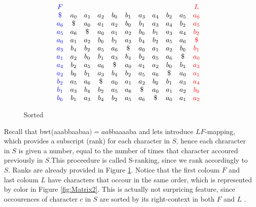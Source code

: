 \documentclass[12pt]{article} %
\begin{document}
\begin{figure}[H]
\[
\begin{array}{*{11}c}
{\color{blue} F } &  &  & & & & & & & & {\color{red} L }  \\ 
{\color{blue} \$ } & a_0 & a_1 & a_2 & b_0 & b_1 & a_3 & a_4 & b_2 & a_5 & {\color{red} a_6 } \\
{\color{blue} a_6 } & \$ & a_0 & a_1 & a_2 & b_0 & b_1 & a_3 & a_4 & b_2 & {\color{red} a_5 }  \\
{\color{blue} a_5 } & a_6 & \$ & a_0 & a_1 & a_2 & b_0 & b_1 & a_3 & a_4 & {\color{red} b_2 } \\
{\color{blue} a_0 } & a_1 & a_2 & b_0 & b_1 & a_3 & b_4 & b_2 & a_5 & a_6 & {\color{red} \$ } \\
{\color{blue} a_3 }  & b_4 & b_2 & a_5 & a_6 & \$ & a_0 & a_1 & a_2 & b_0 & {\color{red} b_1 } \\
{\color{blue} a_1 } & a_2 & b_0 & b_1 & a_3 & b_4 & b_2 & a_5 & a_6 & \$ & {\color{red} a_0 }  \\
{\color{blue} a_4 }  & b_2 & a_5 & a_6 & \$ & a_0 & a_1 & a_2 & b_0 & b_1 & {\color{red} a_3 } \\
{\color{blue} a_2 } & b_0 & b_1 & a_3 & b_4 & b_2 & a_5 & a_6 & \$ & a_0 & {\color{red} a_1 } \\
{\color{blue} b_2  } & a_5 & a_6 & \$ & a_0 & a_1 & a_2 & b_0 & b_1 & a_3 & {\color{red} a_4 } \\
{\color{blue} b_1 }  & a_3 & b_4 & b_2 & a_5 & a_6 & \$ & a_0 & a_1 & a_2 & {\color{red} b_0 }  \\ 
{\color{blue} b_0 }  & b_1 & a_3 & b_4 & b_2 & a_5 & a_6 & \$ & a_0 & a_1 & {\color{red} a_2 } \\
\end{array}
\]
\captionsetup{width=0.8\textwidth}
\caption{Sorted}
\label{fig:Matrix1}
\end{figure}

Recall that bwt(aaabbaabaa$) = aab$baaaaba and lets introduce $LF$-mapping, which provides a subscript (rank) for each character in $S$, hence each chraracter in $S$ is given a number, equal to the number of times that character accoured previously in $S$.This proceedure is called S-ranking, since we rank accordingly to $S$. Ranks are already provided in Figure  \ref{fig:Matrix1}. Notice that the first coloum $F$ and last coloum $L$ have characters that occour in the same order, which is represented by color in Figure \ref{fig:Matrix2}. This is actually not surpricing feature, since occourences of character $c$ in $S$ are sorted by its right-context in both $F$ and $L$ \cite{bwtfmindex}.
\end{document}
